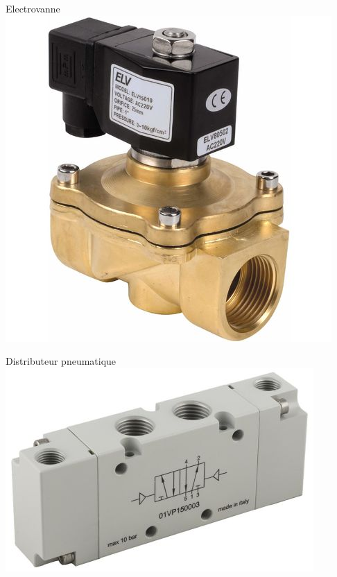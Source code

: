 \begin{UPSTIactivite}
\begin{minipage}[b]{0.24\textwidth}
\end{minipage}
\begin{minipage}[b]{0.24\textwidth}
\centering
  Electrovanne
  \includegraphics[width=\textwidth,height=.15\textheight,keepaspectratio]{images/electrovanne}


\end{minipage}
\begin{minipage}[b]{0.24\textwidth}
\centering
  Distributeur pneumatique
  \includegraphics[width=\textwidth,height=.15\textheight,keepaspectratio]{images/distri_electroPneu}


\end{minipage}
\end{UPSTIactivite}
